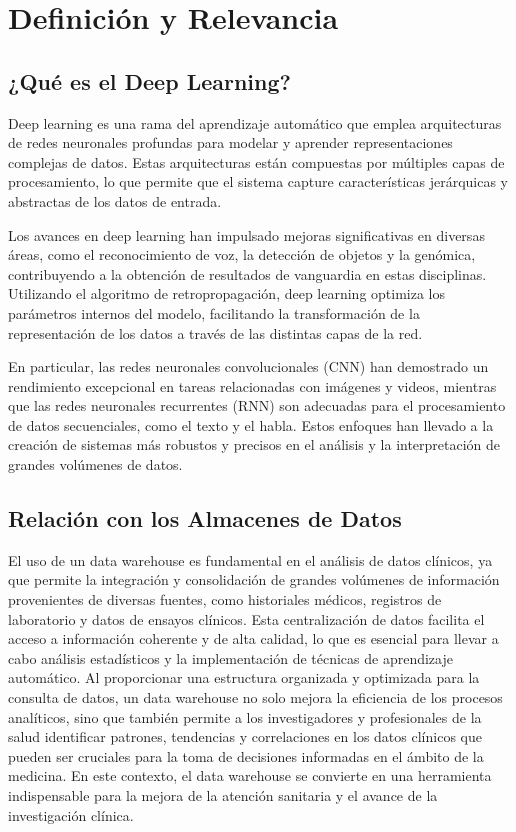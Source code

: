 \documentclass{article}
\begin{document}
\section{Definición y Relevancia}
\subsection{¿Qué es el Deep Learning?}

Deep learning es una rama del aprendizaje automático que emplea arquitecturas de redes neuronales profundas para modelar y aprender representaciones complejas de datos. Estas arquitecturas están compuestas por múltiples capas de procesamiento, lo que permite que el sistema capture características jerárquicas y abstractas de los datos de entrada. \cite{lecun2015deep}

Los avances en deep learning han impulsado mejoras significativas en diversas áreas, como el reconocimiento de voz, la detección de objetos y la genómica, contribuyendo a la obtención de resultados de vanguardia en estas disciplinas. Utilizando el algoritmo de retropropagación, deep learning optimiza los parámetros internos del modelo, facilitando la transformación de la representación de los datos a través de las distintas capas de la red.

En particular, las redes neuronales convolucionales (CNN) han demostrado un rendimiento excepcional en tareas relacionadas con imágenes y videos, mientras que las redes neuronales recurrentes (RNN) son adecuadas para el procesamiento de datos secuenciales, como el texto y el habla. Estos enfoques han llevado a la creación de sistemas más robustos y precisos en el análisis y la interpretación de grandes volúmenes de datos.
\cite{10.1145/3234150}

\subsection{Relación con los Almacenes de Datos}

El uso de un data warehouse es fundamental en el análisis de datos clínicos, ya que permite la integración y consolidación de grandes volúmenes de información provenientes de diversas fuentes, como historiales médicos, registros de laboratorio y datos de ensayos clínicos. Esta centralización de datos facilita el acceso a información coherente y de alta calidad, lo que es esencial para llevar a cabo análisis estadísticos y la implementación de técnicas de aprendizaje automático. Al proporcionar una estructura organizada y optimizada para la consulta de datos, un data warehouse no solo mejora la eficiencia de los procesos analíticos, sino que también permite a los investigadores y profesionales de la salud identificar patrones, tendencias y correlaciones en los datos clínicos que pueden ser cruciales para la toma de decisiones informadas en el ámbito de la medicina. En este contexto, el data warehouse se convierte en una herramienta indispensable para la mejora de la atención sanitaria y el avance de la investigación clínica.\cite{hamoud2018clinical}
\end{document}
